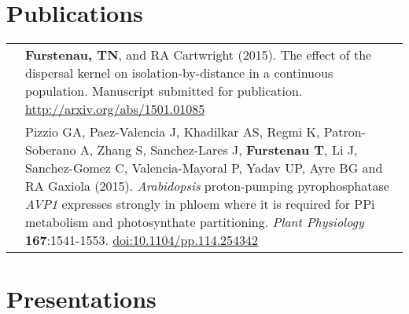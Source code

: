 \documentclass[11pt]{article}
\begin{document}
\section*{Publications}
\renewcommand{\arraystretch}{1.5}
\begin{tabularx}{\linewidth}{l X}
&\textbf{Furstenau, TN}, and RA Cartwright (2015). The effect of the dispersal kernel on isolation-by-distance in a continuous population. Manuscript submitted for publication. \href{http://arxiv.org/abs/1501.01085}{http://arxiv.org/abs/1501.01085}\\
&Pizzio GA, Paez-Valencia J, Khadilkar AS, Regmi K, Patron-Soberano A, Zhang S, Sanchez-Lares J, \textbf{Furstenau T}, Li J, Sanchez-Gomez C, Valencia-Mayoral P, Yadav UP, Ayre BG and RA Gaxiola (2015).\textit{ Arabidopsis} proton-pumping pyrophosphatase \textit{AVP1} expresses strongly in phloem where it is required for PPi metabolism and photosynthate partitioning. \textit{Plant Physiology} \textbf{167}:1541-1553. \href{http:/​/​dx.​doi.​org/​10.​1104/​pp.​114.​254342}{doi:10.1104/pp.114.254342}\\
\end{tabularx}
\section*{Presentations}
\end{document}
